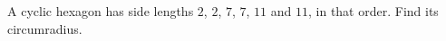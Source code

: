 A cyclic hexagon has side lengths $2$, $2$, $7$, $7$, $11$ and $11$, in that order. Find its circumradius.
